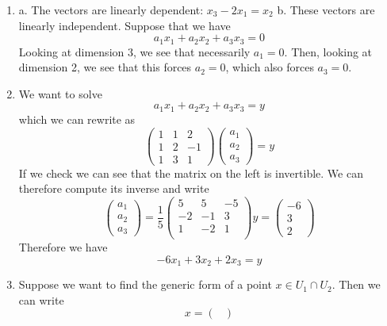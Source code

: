 \documentclass{article}
\newcommand{\chapternumber}{2}
\newenvironment{QandA}{\begin{enumerate}[label=\chapternumber.\arabic*]\bfseries\boldmath}
	{\end{enumerate}}
\newenvironment{answered}{\par\bigskip\normalfont\unboldmath}{}
\begin{document}
\begin{QandA}
\begin{answered}
			d. $D$ is not a subspace since it is not closed under scalar multiplication in $\mathbb{R}$. $(1,1,1)\in D$, but $\frac{1}{2}(1,1,1)=(\frac{1}{2},\frac{1}{2},\frac{1}{2})\notin D$
		\end{answered}
		\item 
		\begin{answered}
			a. The vectors are linearly dependent: $x_3-2x_1=x_2$
			b. These vectors are linearly independent. Suppose that we have
			\[a_1x_1+a_2x_2+a_3x_3=0\]
			Looking at dimension 3, we see that necessarily $a_1=0$. Then, looking at dimension 2, we see that this forces $a_2=0$, which also forces $a_3=0$.
		\end{answered}
		\item
		\begin{answered}
			We want to solve
			\[a_1x_1+a_2x_2+a_3x_3=y\]
			which we can rewrite as
			\[
			\begin{pmatrix}
				1 & 1 & 2 \\
				1 & 2 & -1 \\
				1 & 3 & 1
			\end{pmatrix}
			\begin{pmatrix}
				a_1 \\ a_2 \\ a_3
			\end{pmatrix}
			=
			y
			\]
			If we check we can see that the matrix on the left is invertible. We can therefore compute its inverse and write
			\[
			\begin{pmatrix}
				a_1 \\ a_2 \\ a_3
			\end{pmatrix}
			=
			\frac{1}{5}
			\begin{pmatrix}
				5 &  5 & -5 \\
				-2 & -1 &  3 \\
				1 & -2 &  1 \\
			\end{pmatrix}
			y
			=
			\begin{pmatrix}
				-6 \\ 3 \\ 2
			\end{pmatrix}
			\]
			Therefore we have
			\[-6x_1+3x_2+2x_3=y\]
		\end{answered}
		\item
		\begin{answered}
			Suppose we want to find the generic form of a point $x\in U_1\cap U_2$. Then we can write
			\[x = 
			\begin{pmatrix}

\end{pmatrix}\]
\end{answered}
\end{QandA}
\end{document}
